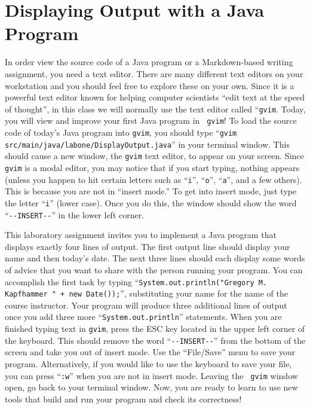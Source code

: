 \documentclass[11pt]{article}
\newcommand{\command}[1]{``\lstinline{#1}''}
\newcommand{\program}[1]{\lstinline{#1}}
\newcommand{\option}[1]{``{#1}''}
\begin{document}
\section*{Displaying Output with a Java Program}

In order view the source code of a Java program or a Markdown-based writing assignment, you need a text editor. There
are many different text editors on your workstation and you should feel free to explore these on your own. Since it is a
powerful text editor known for helping computer scientists ``edit text at the speed of thought'', in this class we will
normally use the text editor called ``{\tt gvim}. Today, you will view and improve your first Java program in {\tt
  gvim}! To load the source code of today's Java program into \program{gvim}, you should type \command{gvim
src/main/java/labone/DisplayOutput.java} in your terminal window. This should cause a new window, the \program{gvim}
text editor, to appear on your screen. Since {\tt gvim} is a modal editor, you may notice that if you start typing,
nothing appears (unless you happen to hit certain letters such as \command{i}, \command{o}, \command{a}, and a few
others). This is because you are not in ``insert mode.'' To get into insert mode, just type the letter \command{i}
(lower case). Once you do this, the window should show the word \command{--INSERT--} in the lower left corner.

This laboratory assignment invites you to implement a Java program that displays exactly four lines of output. The first
output line should display your name and then today's date. The next three lines should each display some words of
advice that you want to share with the person running your program. You can accomplish the first task by typing
\command{System.out.println("Gregory M. Kapfhammer " + new Date());}, substituting your name for the name of the course
instructor. Your program will produce three additional lines of output once you add three more
\command{System.out.println} statements. When you are finished typing text in \program{gvim}, press the ESC key located
in the upper left corner of the keyboard. This should remove the word \command{--INSERT--} from the bottom of the screen
and take you out of insert mode. Use the \option{File/Save} menu to save your program. Alternatively, if you would like
to use the keyboard to save your file, you can press \command{:w} when you are not in insert mode. Leaving the {\tt
gvim} window open, go back to your terminal window. Now, you are ready to learn to use new tools that build and run your
program and check its correctness!
\end{document}

